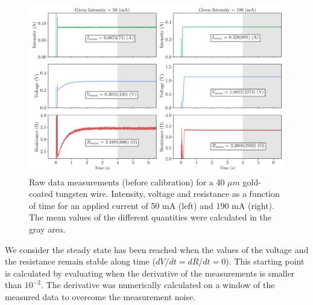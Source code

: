 \begin{figure}[h]
    \centering
    \includegraphics[width=1.0\columnwidth]{Figure_TransientExample1/TransientExample.pdf}
    \caption{Raw data measurements (before calibration) for a 40 $\mu m$ gold-coated tungsten wire. Intensity, voltage and resistance as a function of time for an applied current of 50 mA (left) and 190 mA (right). The mean values of the different quantities were calculated in the gray area. }
    \label{fig:RawMeasurements}
\end{figure}

We consider the steady state has been reached when the values of the voltage and the resistance remain stable along time ($dV/dt = dR/dt = 0 $).  This starting point is calculated by evaluating when the derivative of the measurements is smaller than $10^{-2}$. The derivative was numerically calculated on a window of the measured data to overcome the measurement noise. 

